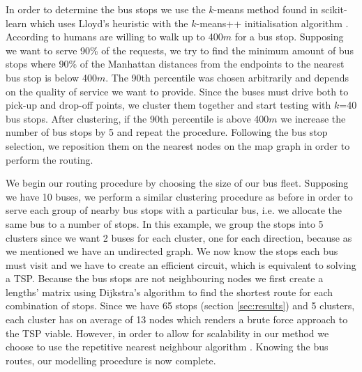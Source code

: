 \documentclass{article}
\begin{document}
In order to determine the bus stops we use the $k$-means method found in scikit-learn \citep{pedregosa_scikit-learn:_2011} which uses Lloyd's heuristic \citep{lloyd_least_1982} with the $k$-means++ initialisation algorithm \citep{arthur_k-means++:_2007}. According to \citet{walker_basics:_2010} humans are willing to walk up to 400$m$ for a bus stop. Supposing we want to serve 90\% of the requests, we try to find the minimum amount of bus stops where 90\% of the Manhattan distances from the endpoints to the nearest bus stop is below 400$m$. The 90th percentile was chosen arbitrarily and depends on the quality of service we want to provide. Since the buses must drive both to pick-up and drop-off points, we cluster them together and start testing with $k$=40 bus stops. After clustering, if the 90th percentile is above 400$m$ we increase the number of bus stops by 5 and repeat the procedure. Following the bus stop selection, we reposition them on the nearest nodes on the map graph in order to perform the routing.

We begin our routing procedure by choosing the size of our bus fleet. Supposing we have 10 buses, we perform a similar clustering procedure as before in order to serve each group of nearby bus stops with a particular bus, i.e. we allocate the same bus to a number of stops. In this example, we group the stops into 5 clusters since we want 2 buses for each cluster, one for each direction, because as we mentioned we have an undirected graph. We now know the stops each bus must visit and we have to create an efficient circuit, which is equivalent to solving a TSP. Because the bus stops are not neighbouring nodes we first create a lengths' matrix using Dijkstra's algorithm \citep{dijkstra_note_1959} to find the shortest route for each combination of stops. Since we have 65 stops (section \ref{sec:results}) and 5 clusters, each cluster has on average of 13 nodes which renders a brute force approach to the TSP viable. However, in order to allow for scalability in our method we choose to use the repetitive nearest neighbour algorithm \citep{klug_k-rnn:_2018}. Knowing the bus routes, our modelling procedure is now complete.
\end{document}
